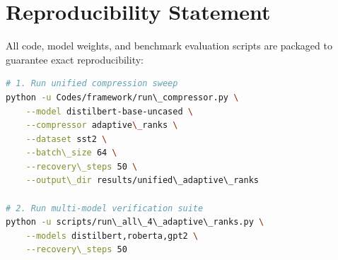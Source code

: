 \section{Reproducibility Statement}
All code, model weights, and benchmark evaluation scripts are packaged to guarantee exact reproducibility:
\begin{lstlisting}[language=bash]
# 1. Run unified compression sweep
python -u Codes/framework/run\_compressor.py \
    --model distilbert-base-uncased \
    --compressor adaptive\_ranks \
    --dataset sst2 \
    --batch\_size 64 \
    --recovery\_steps 50 \
    --output\_dir results/unified\_adaptive\_ranks

# 2. Run multi-model verification suite
python -u scripts/run\_all\_4\_adaptive\_ranks.py \
    --models distilbert,roberta,gpt2 \
    --recovery\_steps 50
\end{lstlisting}
